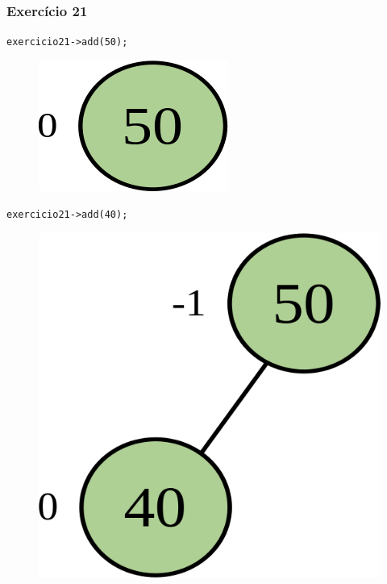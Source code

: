 \documentclass[aspectratio=169]{beamer}
\begin{document}
\begin{frame}[fragile]\frametitle{Exercício 21}
\texttt{exercicio21->add(50);}
\begin{figure}[h]
	\centering
	\includegraphics[height=0.07\paperheight]{imagens/avl-exercicio21a.png}
\end{figure}
\texttt{exercicio21->add(40);}
\begin{figure}[h]
	\centering
	\includegraphics[height=0.15\paperheight]{imagens/avl-exercicio21b.png}
\end{figure}
\end{frame}
\end{document}
